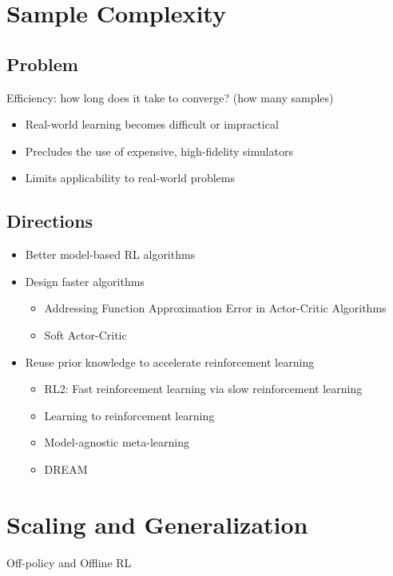 \section{Sample Complexity}
\subsection{Problem}
Efficiency: how long does it take to converge? (how many samples)
\begin{itemize}
	\item Real-world learning becomes difficult or impractical
	\item Precludes the use of expensive, high-fidelity simulators
	\item Limits applicability to real-world problems
\end{itemize}
\cite{irpan18}

\subsection{Directions}
\begin{itemize}
	\item Better model-based \ac{RL} algorithms
	\item Design faster algorithms
	\begin{itemize}
		\item Addressing Function Approximation Error in Actor-Critic Algorithms \cite{fujimoto2018addressing}
		\item Soft Actor-Critic \cite{haarnoja2018soft}
	\end{itemize}
	\item Reuse prior knowledge to accelerate reinforcement learning
	\begin{itemize}
		\item RL2: Fast reinforcement learning via slow reinforcement learning \cite{duan2016rl}
		\item Learning to reinforcement learning \cite{wang2016learning}
		\item Model-agnostic meta-learning \cite{finn2017model}
		\item DREAM \cite{liu2020explore}
	\end{itemize}
\end{itemize}

\section{Scaling and Generalization}
Off-policy and Offline \ac{RL}

